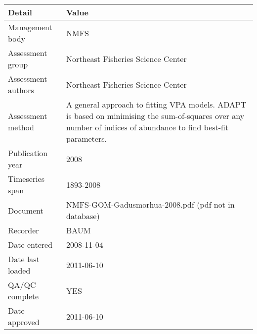 \begin{table}[htb]
\centering
\begin{tabular}{lp{7cm}}
\toprule
Detail & Value \\
\midrule
Management body    & NMFS                                                                                                                                                           \\
Assessment group   & Northeast Fisheries Science Center                                                                                                                             \\
Assessment authors & Northeast Fisheries Science Center                                                                                                                             \\
Assessment method  & A general approach to fitting VPA models. ADAPT is based on minimising the sum-of-squares over any number of indices of abundance to find best-fit parameters. \\
Publication year   & 2008                                                                                                                                                           \\
Timeseries span    & 1893-2008                                                                                                                                                      \\
Document           & NMFS-GOM-Gadusmorhua-2008.pdf (pdf not in database)                                                                                                            \\
Recorder           & BAUM                                                                                                                                                           \\
Date entered       & 2008-11-04                                                                                                                                                     \\
Date last loaded   & 2011-06-10                                                                                                                                                     \\
QA/QC complete     & YES                                                                                                                                                            \\
Date approved      & 2011-06-10                                                                                                                                                     \\
\bottomrule
\end{tabular}
\label{tab:assessdet}
\end{table}
